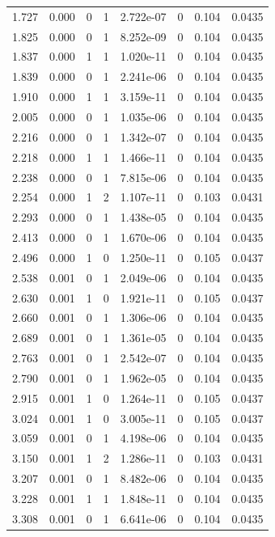\documentclass[preview]{standalone}
\begin{document}
{{\begin{tabular}{L{1.2cm}C{1.2cm} C{0.3cm}C{0.5cm} C{1.4cm}C{1.4cm} C{1.4cm}C{1.4cm}}
  1.727  &  0.000  & 0     &  1 &  2.722e-07  & 0  & 0.104 &  0.0435   \\ 
  1.825  &  0.000  & 0     &  1 &  8.252e-09  & 0  & 0.104 &  0.0435   \\ 
  1.837  &  0.000  & 1     &  1 &  1.020e-11  & 0  & 0.104 &  0.0435   \\ 
  1.839  &  0.000  & 0     &  1 &  2.241e-06  & 0  & 0.104 &  0.0435   \\ 
  1.910  &  0.000  & 1     &  1 &  3.159e-11  & 0  & 0.104 &  0.0435   \\ 
  2.005  &  0.000  & 0     &  1 &  1.035e-06  & 0  & 0.104 &  0.0435   \\ 
  2.216  &  0.000  & 0     &  1 &  1.342e-07  & 0  & 0.104 &  0.0435   \\ 
  2.218  &  0.000  & 1     &  1 &  1.466e-11  & 0  & 0.104 &  0.0435   \\ 
  2.238  &  0.000  & 0     &  1 &  7.815e-06  & 0  & 0.104 &  0.0435   \\ 
  2.254  &  0.000  & 1     &  2 &  1.107e-11  & 0  & 0.103 &  0.0431   \\ 
  2.293  &  0.000  & 0     &  1 &  1.438e-05  & 0  & 0.104 &  0.0435   \\ 
  2.413  &  0.000  & 0     &  1 &  1.670e-06  & 0  & 0.104 &  0.0435   \\ 
  2.496  &  0.000  & 1     &  0 &  1.250e-11  & 0  & 0.105 &  0.0437   \\ 
  2.538  &  0.001  & 0     &  1 &  2.049e-06  & 0  & 0.104 &  0.0435   \\ 
  2.630  &  0.001  & 1     &  0 &  1.921e-11  & 0  & 0.105 &  0.0437   \\ 
  2.660  &  0.001  & 0     &  1 &  1.306e-06  & 0  & 0.104 &  0.0435   \\ 
  2.689  &  0.001  & 0     &  1 &  1.361e-05  & 0  & 0.104 &  0.0435   \\ 
  2.763  &  0.001  & 0     &  1 &  2.542e-07  & 0  & 0.104 &  0.0435   \\ 
  2.790  &  0.001  & 0     &  1 &  1.962e-05  & 0  & 0.104 &  0.0435   \\ 
  2.915  &  0.001  & 1     &  0 &  1.264e-11  & 0  & 0.105 &  0.0437   \\ 
  3.024  &  0.001  & 1     &  0 &  3.005e-11  & 0  & 0.105 &  0.0437   \\ 
  3.059  &  0.001  & 0     &  1 &  4.198e-06  & 0  & 0.104 &  0.0435   \\ 
  3.150  &  0.001  & 1     &  2 &  1.286e-11  & 0  & 0.103 &  0.0431   \\ 
  3.207  &  0.001  & 0     &  1 &  8.482e-06  & 0  & 0.104 &  0.0435   \\ 
  3.228  &  0.001  & 1     &  1 &  1.848e-11  & 0  & 0.104 &  0.0435   \\ 
  3.308  &  0.001  & 0     &  1 &  6.641e-06  & 0  & 0.104 &  0.0435   \\ 
\hline 
\end{tabular} 

}}
\end{document}
